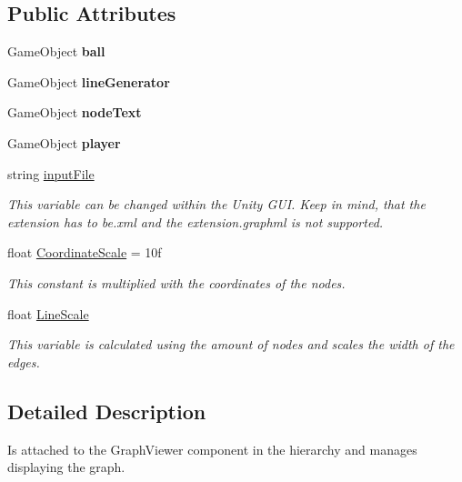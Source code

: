\subsection*{Public Attributes}
\begin{DoxyCompactItemize}
\item 
\mbox{\label{class_graph_drawer_a8126f350e34da05796424c5794935b31}} 
Game\+Object {\bfseries ball}
\item 
\mbox{\label{class_graph_drawer_a50b22b89dca27e868e269266de9aa2a3}} 
Game\+Object {\bfseries line\+Generator}
\item 
\mbox{\label{class_graph_drawer_ab66ad8d286ed137049bf07ef1d3c6f45}} 
Game\+Object {\bfseries node\+Text}
\item 
\mbox{\label{class_graph_drawer_a271926d8a025465e75950519199a8fa7}} 
Game\+Object {\bfseries player}
\item 
string \mbox{\hyperlink{class_graph_drawer_a1264583a4ab9461d51c53c78ca12c5fa}{input\+File}}
\begin{DoxyCompactList}\small\item\em This variable can be changed within the Unity G\+UI. Keep in mind, that the extension has to be.\+xml and the extension.\+graphml is not supported. \end{DoxyCompactList}\item 
float \mbox{\hyperlink{class_graph_drawer_a0a09edfeab5c988ee4ed2e335b0897e7}{Coordinate\+Scale}} = 10f
\begin{DoxyCompactList}\small\item\em This constant is multiplied with the coordinates of the nodes. \end{DoxyCompactList}\item 
float \mbox{\hyperlink{class_graph_drawer_aa5ef4a330d302c0d55a33376a4727edf}{Line\+Scale}}
\begin{DoxyCompactList}\small\item\em This variable is calculated using the amount of nodes and scales the width of the edges. \end{DoxyCompactList}\end{DoxyCompactItemize}


\subsection{Detailed Description}
Is attached to the Graph\+Viewer component in the hierarchy and manages displaying the graph. 



